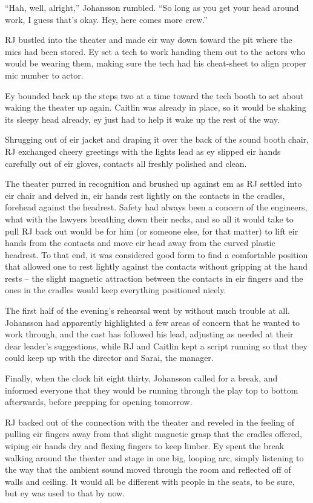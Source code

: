 ``Hah, well, alright,'' Johansson rumbled.  ``So long as you get your head around work, I guess that's okay.  Hey, here comes more crew.''

RJ bustled into the theater and made eir way down toward the pit where the mics had been stored.  Ey set a tech to work handing them out to the actors who would be wearing them, making sure the tech had his cheat-sheet to align proper mic number to actor.

Ey bounded back up the steps two at a time toward the tech booth to set about waking the theater up again.  Caitlin was already in place, so it would be shaking its sleepy head already, ey just had to help it wake up the rest of the way.

Shrugging out of eir jacket and draping it over the back of the sound booth chair, RJ exchanged cheery greetings with the lights lead as ey slipped eir hands carefully out of eir gloves, contacts all freshly polished and clean.

The theater purred in recognition and brushed up against em as RJ settled into eir chair and delved in, eir hands rest lightly on the contacts in the cradles, forehead against the headrest.  Safety had always been a concern of the engineers, what with the lawyers breathing down their necks, and so all it would take to pull RJ back out would be for him (or someone else, for that matter) to lift eir hands from the contacts and move eir head away from the curved plastic headrest.  To that end, it was considered good form to find a comfortable position that allowed one to rest lightly against the contacts without gripping at the hand rests -- the slight magnetic attraction between the contacts in eir fingers and the ones in the cradles would keep everything positioned nicely.

The first half of the evening's rehearsal went by without much trouble at all.  Johansson had apparently highlighted a few areas of concern that he wanted to work through, and the cast has followed his lead, adjusting as needed at their dear leader's suggestions, while RJ and Caitlin kept a script running so that they could keep up with the director and Sarai, the manager.

Finally, when the clock hit eight thirty, Johansson called for a break, and informed everyone that they would be running through the play top to bottom afterwards, before prepping for opening tomorrow.

RJ backed out of the connection with the theater and reveled in the feeling of pulling eir fingers away from that slight magnetic grasp that the cradles offered, wiping eir hands dry and flexing fingers to keep limber.  Ey spent the break walking around the theater and stage in one big, looping arc, simply listening to the way that the ambient sound moved through the room and reflected off of walls and ceiling.  It would all be different with people in the seats, to be sure, but ey was used to that by now.

